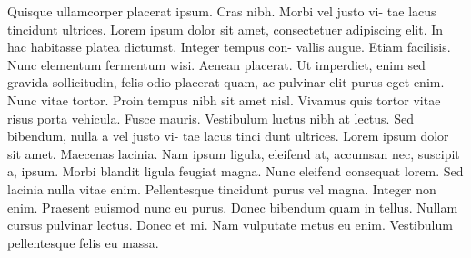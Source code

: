 \documentclass[12pt]{scrartcl}
\begin{document}
Quisque ullamcorper placerat ipsum. Cras nibh. Morbi vel justo vi- tae
lacus tincidunt ultrices. Lorem ipsum dolor sit amet, consectetuer
adipiscing elit. In hac habitasse platea dictumst. Integer tempus con-
vallis augue. Etiam facilisis. Nunc elementum fermentum wisi. Aenean
placerat. Ut imperdiet, enim sed gravida sollicitudin, felis odio placerat
quam, ac pulvinar elit purus eget enim. Nunc vitae tortor. Proin tempus
nibh sit amet nisl. Vivamus quis tortor vitae risus porta
vehicula. Fusce mauris. Vestibulum luctus nibh at lectus. Sed bibendum,
nulla a vel justo vi- tae lacus tinci dunt ultrices. Lorem ipsum dolor sit
amet. Maecenas lacinia. Nam ipsum ligula, eleifend at, accumsan nec,
suscipit a, ipsum. Morbi blandit ligula feugiat magna. Nunc eleifend
consequat lorem. Sed lacinia nulla vitae enim. Pellentesque tincidunt
purus vel magna. Integer non enim. Praesent euismod nunc eu purus. Donec
bibendum quam in tellus. Nullam cursus pulvinar lectus. Donec et mi. Nam
vulputate metus eu enim. Vestibulum pellentesque felis eu massa.
\end{document}

